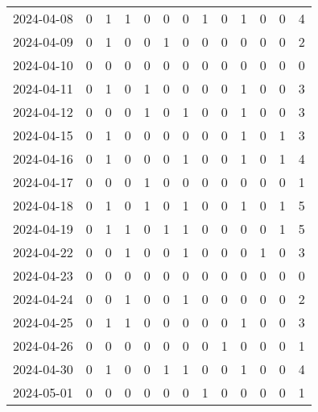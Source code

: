 \documentclass[dvipdfmx,oneside]{article}
\begin{document}
\begin{longtable}{lcccccccccccc}
        2024-04-08 &     0 &     1 &     1 &     0 &     0 &     0 &     1 &     0 &     1 &     0 &     0 &      4 \\
        2024-04-09 &     0 &     1 &     0 &     0 &     1 &     0 &     0 &     0 &     0 &     0 &     0 &      2 \\
        2024-04-10 &     0 &     0 &     0 &     0 &     0 &     0 &     0 &     0 &     0 &     0 &     0 &      0 \\
        2024-04-11 &     0 &     1 &     0 &     1 &     0 &     0 &     0 &     0 &     1 &     0 &     0 &      3 \\
        2024-04-12 &     0 &     0 &     0 &     1 &     0 &     1 &     0 &     0 &     1 &     0 &     0 &      3 \\
        2024-04-15 &     0 &     1 &     0 &     0 &     0 &     0 &     0 &     0 &     1 &     0 &     1 &      3 \\
        2024-04-16 &     0 &     1 &     0 &     0 &     0 &     1 &     0 &     0 &     1 &     0 &     1 &      4 \\
        2024-04-17 &     0 &     0 &     0 &     1 &     0 &     0 &     0 &     0 &     0 &     0 &     0 &      1 \\
        2024-04-18 &     0 &     1 &     0 &     1 &     0 &     1 &     0 &     0 &     1 &     0 &     1 &      5 \\
        2024-04-19 &     0 &     1 &     1 &     0 &     1 &     1 &     0 &     0 &     0 &     0 &     1 &      5 \\
        2024-04-22 &     0 &     0 &     1 &     0 &     0 &     1 &     0 &     0 &     0 &     1 &     0 &      3 \\
        2024-04-23 &     0 &     0 &     0 &     0 &     0 &     0 &     0 &     0 &     0 &     0 &     0 &      0 \\
        2024-04-24 &     0 &     0 &     1 &     0 &     0 &     1 &     0 &     0 &     0 &     0 &     0 &      2 \\
        2024-04-25 &     0 &     1 &     1 &     0 &     0 &     0 &     0 &     0 &     1 &     0 &     0 &      3 \\
        2024-04-26 &     0 &     0 &     0 &     0 &     0 &     0 &     0 &     1 &     0 &     0 &     0 &      1 \\
        2024-04-30 &     0 &     1 &     0 &     0 &     1 &     1 &     0 &     0 &     1 &     0 &     0 &      4 \\
        2024-05-01 &     0 &     0 &     0 &     0 &     0 &     0 &     1 &     0 &     0 &     0 &     0 &      1 \\

\end{longtable}
\end{document}
